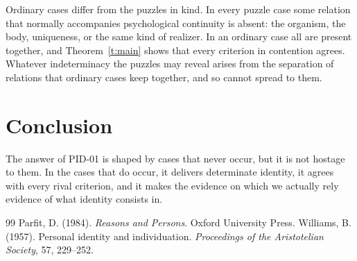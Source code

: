 \documentclass{situationist-preprint}
\begin{document}
\begin{reply}
Ordinary cases differ from the puzzles in kind. In every puzzle case some relation that normally accompanies psychological continuity is absent: the organism, the body, uniqueness, or the same kind of realizer. In an ordinary case all are present together, and Theorem~\ref{t:main} shows that every criterion in contention agrees. Whatever indeterminacy the puzzles may reveal arises from the separation of relations that ordinary cases keep together, and so cannot spread to them.
\end{reply}

\section{Conclusion}

The answer of PID-01 is shaped by cases that never occur, but it is not hostage to them. In the cases that do occur, it delivers determinate identity, it agrees with every rival criterion, and it makes the evidence on which we actually rely evidence of what identity consists in.

\begin{thebibliography}{99}\small
{} Parfit, D. (1984). \emph{Reasons and Persons}. Oxford University Press.
 Williams, B. (1957). Personal identity and individuation. \emph{Proceedings of the Aristotelian Society}, 57, 229--252.
\end{thebibliography}
\end{document}

